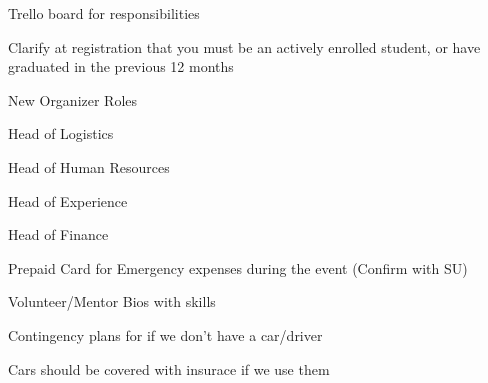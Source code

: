 \documentclass[11pt,hacksoc]{meetingmins}
\begin{document}
\begin{items}
	\subitem
	Trello board for responsibilities	
	
	\subitem
	Clarify at registration that you must be an actively enrolled student, or have graduated in the previous 12 months
	
	\subitem
		New Organizer Roles
		
		\subsubitem
		Head of Logistics
		
		\subsubitem
		Head of Human Resources
		
		\subsubitem
		Head of Experience
		
		\subsubitem
		Head of Finance
		
	\subitem
		Prepaid Card for Emergency expenses during the event (Confirm with SU)
	
	\subitem
	Volunteer/Mentor Bios with skills
	
	\subitem
	Contingency plans for if we don't have a car/driver
	
	\subitem
	Cars should be covered with insurace if we use them

\end{items}

\vspace{1em}
\end{document}
